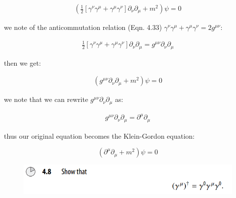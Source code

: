 \documentclass[11pt]{article}
\theoremstyle{definition}
\begin{document}
\begin{align*}
    \left(  \frac{1}{2}\left[\gamma^{\nu}\gamma^{\mu}  + \gamma^{\mu}\gamma^{\nu}\right]\partial_{\nu}\partial_{\mu} + m^2 \right)\psi =0
\end{align*}

we note of the anticommutation relation (Eqn. 4.33) $\gamma^{\nu}\gamma^{\mu}  + \gamma^{\mu}\gamma^{\nu} = 2g^{\mu\nu}$:

\begin{align*}
    \frac{1}{2}\left[\gamma^{\nu}\gamma^{\mu}  + \gamma^{\mu}\gamma^{\nu}\right]\partial_{\nu}\partial_{\mu}=  
    g^{\mu\nu}\partial_{\nu}\partial_{\mu}
\end{align*}

then we get:

\begin{align*}
    \left(  g^{\mu\nu}\partial_{\nu}\partial_{\mu} + m^2 \right)\psi =0
\end{align*}

we note that we can rewrite $g^{\mu\nu}\partial_{\nu}\partial_{\mu}$ as:

\begin{align*}
    g^{\mu\nu}\partial_{\nu}\partial_{\mu} = \partial^{\mu} \partial_{\mu}
\end{align*}

thus our original equation becomes the Klein-Gordon equation:

\begin{equation}
\boxed{
    \left(\partial^{\mu} \partial_{\mu} + m^2 \right)\psi =0
}
\end{equation}




\newpage

\begin{figure}[h!]
    \centering
    \includegraphics[scale = 0.55]{4.8.png}
\end{figure}
\end{document}
